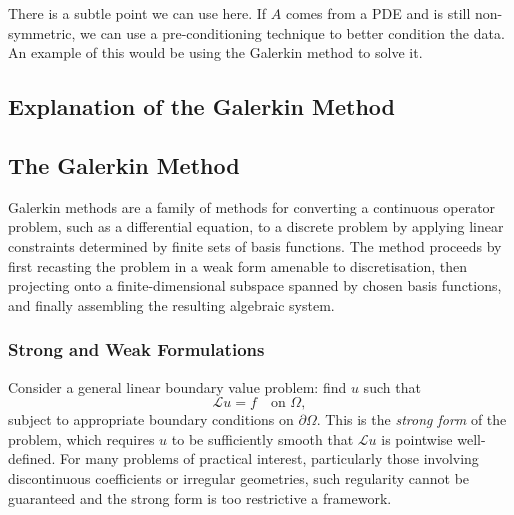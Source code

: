 \documentclass[12pt]{article}
\theoremstyle{definition}
\theoremstyle{remark}
\begin{document}
There is a subtle point we can use here. If $A$ comes from a PDE and is still non-symmetric, we can use a pre-conditioning technique to better condition the data. An example of this would be using the Galerkin method to solve it. 
\subsection{Explanation of the Galerkin Method}\label{sec:galerkin-intro}
\subsection{The Galerkin Method}\label{sec:galerkin}

Galerkin methods are a family of methods for converting a continuous operator
problem, such as a differential equation, to a discrete problem by applying
linear constraints determined by finite sets of basis functions. The method
proceeds by first recasting the problem in a weak form amenable to
discretisation, then projecting onto a finite-dimensional subspace spanned by
chosen basis functions, and finally assembling the resulting algebraic system.

\subsubsection{Strong and Weak Formulations}\label{sec:strong-weak}

Consider a general linear boundary value problem: find $u$ such that
\begin{equation}
    \mathcal{L}u = f \quad \text{on } \Omega,
\end{equation}
subject to appropriate boundary conditions on $\partial\Omega$. This is the
\emph{strong form} of the problem, which requires $u$ to be sufficiently smooth
that $\mathcal{L}u$ is pointwise well-defined. For many problems of practical
interest, particularly those involving discontinuous coefficients or irregular
geometries, such regularity cannot be guaranteed and the strong form is too
restrictive a framework.
\end{document}
